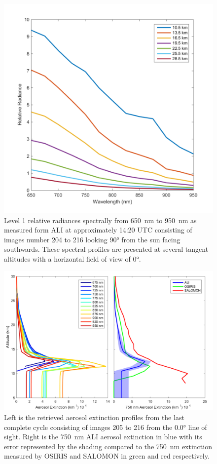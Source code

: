 \documentclass[12pt]{article}
\begin{document}
\begin{figure}
\includegraphics[width=1.0\textwidth]{./Images/5-2-AliSpectralRadiances.pdf}
    \caption{Level 1 relative radiances spectrally from 650~nm to 950~nm as measured form ALI at approximately 14:20 UTC consisting of images number 204 to 216 looking 90\si{\degree} from the sun facing southwards. These spectral profiles are presented at several tangent altitudes with a horizontal field of view of 0\si{\degree}.}
    \label{fig:AliSpectralRadiances}
\end{figure}

\newpage

\begin{figure}
\includegraphics[width=1.0\textwidth]{./Images/5-3-FullAerosolCycleComparison.pdf}
    \caption{Left is the retrieved aerosol extinction profiles from the last complete cycle consisting of images 205 to 216 from the 0.0\si{\degree} line of sight. Right is the 750~nm ALI aerosol extinction in blue with its error represented by the shading compared to the 750~nm extinction measured by OSIRIS and SALOMON in green and red respectively.}
    \label{fig:AliAerosolCycle}
\end{figure}
\end{document}
